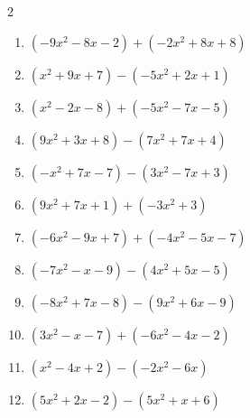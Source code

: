 


\setcounter{quesnum}{38}

\begin{multicols}{2}
\begin{enumerate}
  \itemsep=1pt
  \item $(-9x^{2}-8x-2)+(-2x^{2}+8x+8)$


  \item $(x^{2}+9x+7)-(-5x^{2}+2x+1)$


  \item $(x^{2}-2x-8)+(-5x^{2}-7x-5)$


  \item $(9x^{2}+3x+8)-(7x^{2}+7x+4)$


  \item $(-x^{2}+7x-7)-(3x^{2}-7x+3)$


  \item $(9x^{2}+7x+1)+(-3x^{2}+3)$


  \item $(-6x^{2}-9x+7)+(-4x^{2}-5x-7)$


  \item $(-7x^{2}-x-9)-(4x^{2}+5x-5)$


  \item $(-8x^{2}+7x-8)-(9x^{2}+6x-9)$


  \item $(3x^{2}-x-7)+(-6x^{2}-4x-2)$


  \item $(x^{2}-4x+2)-(-2x^{2}-6x)$


  \item $(5x^{2}+2x-2)-(5x^{2}+x+6)$

        \phantom{$=x-8$}


\end{enumerate}
\end{multicols}
